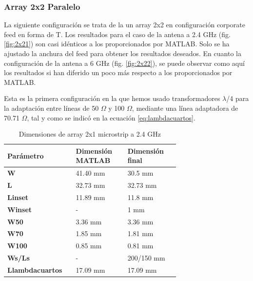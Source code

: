 \subsubsection{Array 2x2 Paralelo} 
\par La siguiente configuración se trata de la un array 2x2 en configuración corporate feed en forma de T. Los resultados para el caso de la antena a 2.4 GHz (fig. \ref{fig:2x21}) son casi idénticos a los proporcionados por MATLAB. Solo se ha ajustado la anchura del feed para obtener los resultados deseados. En cuanto la configuración de la antena a 6 GHz (fig. \ref{fig:2x22}), se puede observar como aquí los resultados si han diferido un poco más respecto a los proporcionados por MATLAB.
\\
\par Esta es la primera configuración en la que hemos usado transformadores  $\lambda$/4 para la adaptación entre líneas de 50 $\Omega$ y 100 $\Omega$, mediante una línea adaptadora de 70.71 $\Omega$, tal y como se indicó en la ecuación \ref{eq:lambdacuartos}.
\\
\begin{table}[H]
  
   \label{tab:array2x21}
   \small %
   \centering %
   \begin{tabular}{m{0.2\linewidth}m{0.25\linewidth}m{0.25\linewidth}} %
   \toprule[\heavyrulewidth]\toprule[\heavyrulewidth]
   \textbf{Parámetro} & \textbf{Dimensión MATLAB} & \textbf{Dimensión final} \\ 
   \midrule
   \textbf{W} & 41.40 mm & 30.5 mm \\
   \textbf{L} & 32.73 mm & 32.73 mm\\
   \textbf{Linset} & 11.89 mm & 11.8 mm\\
   \textbf{Winset} & - & 1 mm\\
   \textbf{W50} & 3.36 mm & 3.36 mm\\
   \textbf{W70} & 1.85 mm & 1.81 mm\\
   \textbf{W100} & 0.85 mm & 0.81 mm\\
   \textbf{Ws/Ls} & - & 200/150 mm\\
   \textbf{Llambdacuartos} & 17.09 mm & 17.09 mm\\
   \bottomrule[\heavyrulewidth] 
   \end{tabular}
   \caption{Dimensiones de array 2x1 microstrip a 2.4 GHz} 
\end{table}


